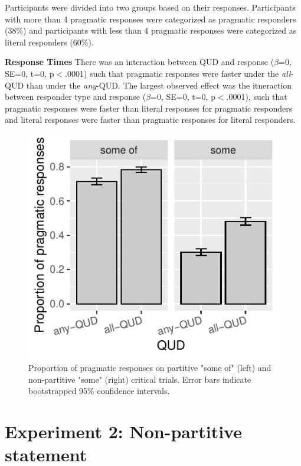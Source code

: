 \documentclass[10pt,letterpaper]{article}
\begin{document}
Participants were divided into two groups based on their responses. Participants with more than 4 pragmatic responses were categorized as pragmatic responders (38\%) and participants with less than 4 pragmatic responses were categorized as literal responders (60\%).

\noindent \textbf{Response Times} 
There was an interaction between QUD and response ($\beta$=0, SE=0, t=0, p$<$.0001) such that pragmatic responses were faster under the \textit{all}-QUD than under the \textit{any}-QUD. The largest observed effect was the itneraction between responder type and response ($\beta$=0, SE=0, t=0, p$<$.0001), such that pragmatic responses were faster than literal responses for pragmatic responders and literal responses were faster than pragmatic responses for literal responders.

\begin{figure}
\includegraphics[width=\columnwidth]{plots/judgements.pdf}
\caption{Proportion of pragmatic responses on partitive "some of" (left) and non-partitive "some" (right) critical trials. Error bars indicate bootstrapped 95\% confidence intervals. \label{fig:judgements}}
\end{figure}

\section{Experiment 2: Non-partitive statement}
\end{document}
